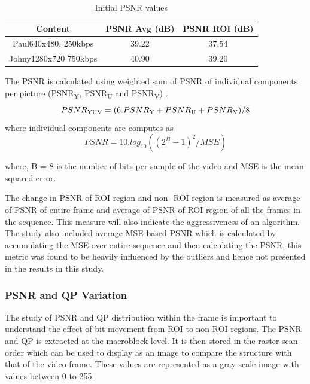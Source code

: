 \documentclass[11pt]{article} %
\begin{document}
\begin{table} [h!]
\centering
\begin{tabular}{ |c|c|c| }
 \hline
Content & PSNR Avg (dB) & PSNR ROI (dB) \\
 \hline 
 Paul640x480, 250kbps & 39.22 & 37.54 \\ 
 Johny1280x720 750kbps & 40.90 & 39.20 \\  
 \hline
\end{tabular}
 \caption{Initial PSNR values}
 \label{InitPSNR1}
\end{table}

The PSNR is calculated using weighted sum of PSNR of individual components per picture (PSNR\textsubscript{Y}, PSNR\textsubscript{U} and PSNR\textsubscript{V}) \cite{ComparingCodingEfficiency}.
\begin{equation}
\label{Eq:PSNR}
PSNR\textsubscript{YUV} = ( 6 . PSNR\textsubscript{Y} + PSNR\textsubscript{U} + PSNR\textsubscript{V}) / 8
\end{equation}
 where individual components are computes as
\begin{equation}
\label{Eq:PSNRDef}
PSNR = 10 . log_{10}((2^B - 1)^2 / MSE)
\end{equation}

where, B = 8 is the number of bits per sample of the video and MSE is the mean squared error.

 The change in PSNR of ROI region and non- ROI region is measured as average of PSNR of entire frame and average of PSNR of ROI region of all the frames in the sequence. This measure will also indicate the aggressiveness of an algorithm. The study also included average MSE based PSNR which is calculated by accumulating the MSE over entire sequence and then calculating the PSNR, this metric was found to be heavily influenced by the outliers and hence not presented in the results in this study.
\subsubsection{PSNR and QP Variation}
The study of PSNR and QP distribution within the frame is important to understand the effect of bit movement from ROI to non-ROI regions. The PSNR and QP is extracted at the macroblock level. It is then stored in the raster scan order which can be used to display as  an image to compare the structure with that of the video frame. These values are represented as a gray scale image with values between 0 to 255. 
\end{document}
